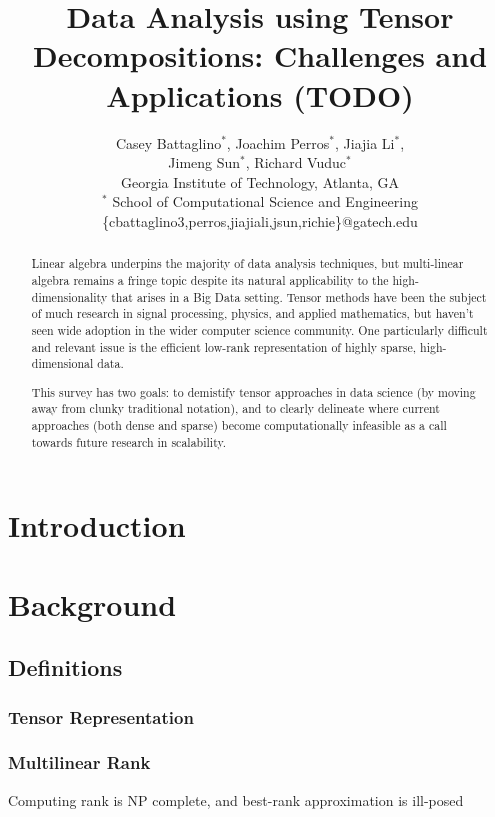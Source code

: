 \documentclass[10pt]{article}
\title{Data Analysis using Tensor Decompositions: Challenges and Applications (TODO)}
\author{
  Casey Battaglino$^\ast$, Joachim Perros$^\ast$, Jiajia Li$^\ast$, \\
   Jimeng Sun$^\ast$, Richard Vuduc$^\ast$
  \\ Georgia Institute of Technology, Atlanta, GA
  \\ $^\ast$ School of Computational Science and Engineering \\
  \{cbattaglino3,perros,jiajiali,jsun,richie\}@gatech.edu } \date{}
\begin{document}

\maketitle

\begin{abstract}
Linear algebra underpins the majority of data analysis techniques, but multi-linear algebra remains a fringe topic despite its natural applicability to the high-dimensionality that arises in a Big Data setting. Tensor methods have been the subject of much research in signal processing, physics, and applied mathematics, but haven't seen wide adoption in the wider computer science community. One particularly difficult and relevant issue is the efficient low-rank representation of highly sparse, high-dimensional data.

This survey has two goals: to demistify tensor approaches in data science (by moving away from clunky traditional notation), and to clearly delineate where current approaches (both dense and sparse) become computationally infeasible as a call towards future research in scalability.


\end{abstract}

\tableofcontents
\section{Introduction} \label{sec:intro}

\section{Background} \label{sec:background}
\subsection{Definitions} \label{sec:definitions}
\subsubsection{Tensor Representation}
\subsubsection{Multilinear Rank}
Computing rank is NP complete, and best-rank approximation is ill-posed~\cite{Kolda09tensordecompositions}
\end{document}
